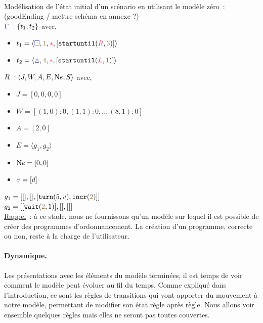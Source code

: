 \documentclass[oneside, a4paper, 11pt]{book}
\newcommand{\trainFmt}[1]{{\color{traincolor} #1}}
\newcommand{\trainTuple}[4]{\langle \trainFmt{#1}, \posFmt{#2}, \dirFmt{#3}, #4 \rangle}
\newcommand{\dirFmt}[1]{{\color{dircolor} #1}}
\newcommand{\posFmt}[1]{{\color{poscolor}{#1}}}
\newcommand{\su}[2]{{\mbox{$\mathtt{startuntil}(\dirFmt{#1}, \posFmt{#2})$}}}
\newcommand{\incr}[1]{{\mbox{\ensuremath{\mathtt{incr}(\posFmt{#1})}}}}
\newcommand{\turnOrder}[2]{{\mbox{\ensuremath{\mathtt{turn}(#1, #2)}}}}
\newcommand{\wait}[2]{{\mbox{\ensuremath{\mathtt{wait}(\posFmt{#1}, #2)}}}}
\newcommand{\swFmt}[1]{{\color{swcolor}{#1}}}
\begin{document}
\begin{example}[GoodEnding M0]
	~\\
	Modélisation de l'état initial d'un scénario en utilisant le modèle zéro~: (goodEnding / mettre schéma en annexe ?)
	\\$\trainFmt{\Gamma}~: \{t_1, t_2\}$ avec,
	\begin{itemize}
		\item[] $t_1 = \trainTuple{\square}{1}{*}{[\su{R}{3}]}$
		\item[] $t_2 = \trainTuple{\vartriangle}{4}{*}{[\su{L}{1}]}$
	\end{itemize}
	\vspace{0.3cm}
	$R~: \langle J,W,A,E,{\text Ne},S \rangle$ avec,	
	\begin{itemize}
		\item[] $J = [0,0,0,0]$
		\item[] $W = [(1,0) : 0, (1,1) : 0, .., (8,1) : 0]$
		\item[] $A = [2,0]$
		\item[] $E = \langle g_1, g_2 \rangle$
		\item[] ${\text Ne} = [0, 0]$
		\item[] $\swFmt{\sigma} = [d]$
	\end{itemize}
	\vspace{0.3cm}
	$g_1 = [[],[],[\turnOrder{5}{v}, \incr{2}]]$
	\\$g_2 = [[\wait{2}{1}],[],[]]$
	\vspace{0.5cm}\\
	\underline{Rappel}~: à ce stade, nous ne fournissons qu'un modèle sur lequel il est possible de créer des programmes d'ordonnancement. La création d'un programme, correcte ou non, reste à la charge de l'utilisateur.
\end{example}


\paragraph{Dynamique.} 
Les présentations avec les éléments du modèle terminées, il est temps de voir comment le modèle peut évoluer au fil du temps.
Comme expliqué dans l'introduction, ce sont les règles de transitions qui vont apporter du mouvement à notre modèle, permettant de modifier son état règle après règle. Nous allons voir ensemble quelques règles mais elles ne seront pas toutes couvertes.
\end{document}
